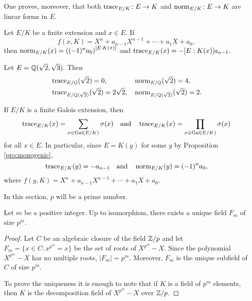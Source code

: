 One proves, moreover, that both 
$\operatorname{trace}_{E/K}\colon E\to K$ and $\operatorname{norm}_{E/K}\colon E\to K$ 
are linear forms in $E$. 

\begin{exercise}
        Let $E/K$ be a finite extension and
        $x\in E$. If
        \[
        f(x,K)=X^n+a_{n-1}X^{n-1}+\cdots+a_1X+a_0,
        \]
        then 
        $\operatorname{norm}_{E/K}(x)=\left((-1)^na_0\right)^{[E:K(x)]}$ and 
        $\operatorname{trace}_{E/K}(x)=-[E:K(x)]a_{n-1}$. 
\end{exercise}

\begin{example}
    Let $E=\mathbb{Q}(\sqrt{2},\sqrt{3})$. Then 
    \begin{align*}
    &\operatorname{trace}_{E/\mathbb{Q}}(\sqrt{2})=0,
    &&
    \operatorname{norm}_{E/\mathbb{Q}}(\sqrt{2})=4,\\
    &\operatorname{trace}_{E/\mathbb{Q}(\sqrt{2})}(\sqrt{2})=2\sqrt{2},
    &&\operatorname{norm}_{E/\mathbb{Q}(\sqrt{2})}(\sqrt{2})=2.    
    \end{align*}
\end{example}

\begin{example}
    If $E/K$ is a finite Galois extension, then 
    \[
    \operatorname{trace}_{E/K}(x)=\sum_{\sigma\in\operatorname{Gal}(E/K)}\sigma(x)
    \quad\text{and}\quad
    \operatorname{trace}_{E/K}(x)=\prod_{\sigma\in\operatorname{Gal}(E/K)}\sigma(x)
    \]
    for all $x\in E$. In particular, since $E=K(y)$ for some
    $y$ by Proposition \ref{pro:monogenic}, 
    \[
    \operatorname{trace}_{E/K}(y)=-a_{n-1}
    \quad\text{and}\quad
    \operatorname{norm}_{E/K}(y)=(-1)^na_0,
    \]
    where
    $f(y,K)=X^n+a_{n-1}X^{n-1}+\cdots+a_1X+a_0$.
\end{example}        


In this section, $p$ will be a prime number. 

\begin{proposition}
    Let $m$ be a positive integer. 
    Up to isomorphism, there exists a unique 
    field $F_m$ of size $p^m$. 
\end{proposition}

\begin{proof}
    Let $C$ be an algebraic closure of the field $\mathbb{Z}/p$ and 
    let $F_m=\{x\in C:x^{p^m}=x\}$ be the set of roots of $X^{p^m}-X$. Since 
    the polynomial $X^{p^m}-X$ has no multiple roots, $|F_m|=p^m$. Moreover, 
    $F_m$ is the unique subfield of $C$ of size $p^m$. 
    
    To prove the uniqueness it is enough to note that if $K$ is a field of $p^m$ elements, then
    $K$ is the decomposition field of $X^{p^m}-X$ over $\mathbb{Z}/p$.  
\end{proof}

